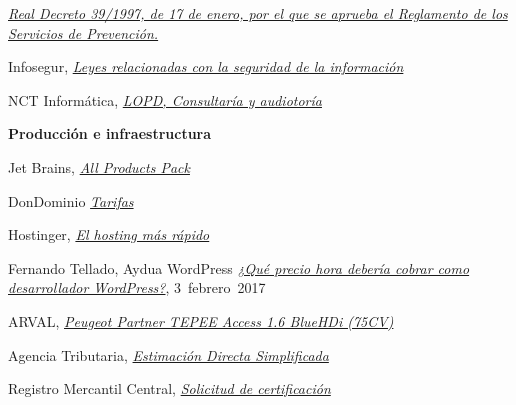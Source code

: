 		\href{https://www.boe.es/buscar/act.php?id=BOE-A-1997-1853}{\textit{Real Decreto 39/1997, de 17 de enero, por el que se aprueba el Reglamento de los Servicios de Prevención.}}
		
		Infosegur,
		\href{https://infosegur.wordpress.com/unidad-1/leyes-relacionadas-con-la-seguridad-de-la-informacion/}{\textit{Leyes relacionadas con la seguridad de la información}}
		
		NCT Informática,
		\href{http://www.nct-informatica.com/soluciones/lopd/}{\textit{LOPD, Consultaría y audiotoría}}
		

\textbf{Producción e infraestructura}

		Jet Brains,
		\href{https://www.jetbrains.com/store/?fromMenu#edition=commercial}{\textit{All Products Pack}}

		DonDominio
		\href{https://www.dondominio.com/products/rates/}{\textit{Tarifas}}

		Hostinger,
		\href{https://www.hostinger.es/}{\textit{El hosting más rápido}}

		Fernando Tellado, Aydua WordPress
		\href{https://ayudawp.com/que-precio-hora-deberia-cobrar-como-desarrollador-wordpress/}{\textit{¿Qué precio hora debería cobrar como desarrollador WordPress?}},
		\mbox{3 febrero 2017}
		
		ARVAL,
		\href{https://www.arval.es/ofertas-renting/ofertas?type_car=8}{\textit{Peugeot Partner TEPEE Access 1.6 BlueHDi (75CV)}}
		
		Agencia Tributaria,
		\href{https://www.agenciatributaria.es/AEAT.internet/Inicio/_Segmentos_/Empresas_y_profesionales/Empresarios_individuales_y_profesionales/Rendimientos_de_actividades_economicas_en_el_IRPF/Regimenes_para_determinar_el_rendimiento_de_las_actividades_economicas/Estimacion_Directa_Simplificada.shtml}{\textit{Estimación Directa Simplificada}}
		
		Registro Mercantil Central,
		\href{https://www.rmc.es/privado/CertificacionesDenominaciones.aspx}{\textit{Solicitud de certificación}}
		